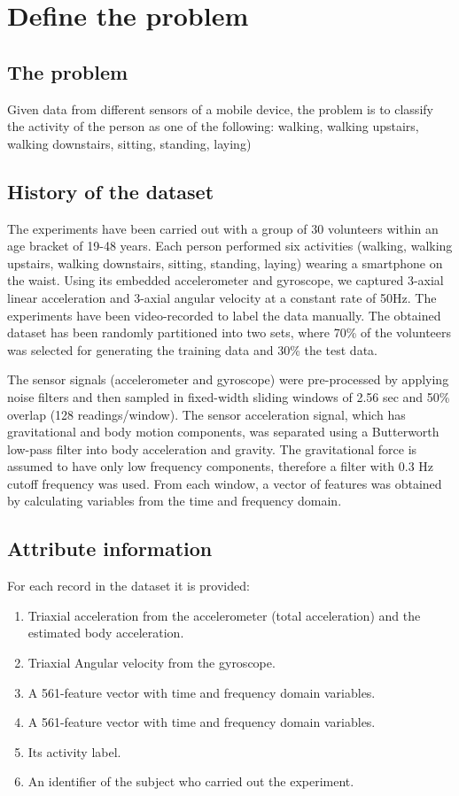 \chapter{Define the problem}

\section{The problem}
Given data from different sensors of a mobile device, the problem is to classify the activity of the person as one of the following: walking, walking upstairs, walking downstairs, sitting, standing, laying)

\section{History of the dataset}
The experiments have been carried out with a group of 30
volunteers within an age bracket of 19-48 years. Each
person performed six activities (walking, walking upstairs, walking downstairs, sitting, standing, laying) wearing a smartphone on the
waist. Using its embedded accelerometer and gyroscope, we
captured 3-axial linear acceleration and 3-axial angular
velocity at a constant rate of 50Hz. The experiments have
been video-recorded to label the data manually. The
obtained dataset has been randomly partitioned into two
sets, where 70\% of the volunteers was selected for
generating the training data and 30\% the test data. 

The sensor signals (accelerometer and gyroscope) were
pre-processed by applying noise filters and then sampled
in fixed-width sliding windows of 2.56 sec and 50\%
overlap (128 readings/window). The sensor acceleration
signal, which has gravitational and body motion
components, was separated using a Butterworth low-pass
filter into body acceleration and gravity. The
gravitational force is assumed to have only low frequency
components, therefore a filter with 0.3 Hz cutoff
frequency was used. From each window, a vector of features
was obtained by calculating variables from the time and
frequency domain. \cite{uci-link}

\section{Attribute information}
For each record in the dataset it is provided:
\begin{enumerate}
    \item Triaxial acceleration from the accelerometer (total acceleration) and the estimated body acceleration.
    \item Triaxial Angular velocity from the gyroscope.
    \item A 561-feature vector with time and frequency domain variables.
    \item A 561-feature vector with time and frequency domain variables.
    \item Its activity label. 
    \item An identifier of the subject who carried out the experiment.
\end{enumerate}

